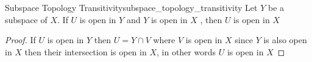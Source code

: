 \begin{proposition}{Subspace Topology
Transitivity}{subspace_topology_transitivity}
Let \( Y \) be a subspace of \( X \). If \( U \) is open in \( Y \) and \( Y \)
is open in \( X \) , then \( U \) is open in \( X \) 
\end{proposition}
\begin{proof}
   If \( U  \) is open in \( Y \) then \( U =  Y \cap  V \)  where \( V \) is
   open in \( X \) since \( Y \)  is also open in \( X \) then their
   intersection is open in \( X \), in other words \( U  \) is open in \( X \) 
\end{proof}
